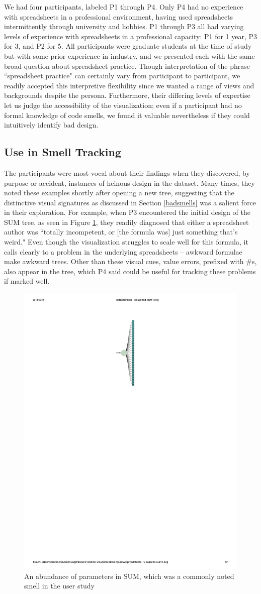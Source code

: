 \documentclass[conference]{IEEEtran}
\begin{document}
	We had four participants, labeled P1 through P4. Only P4 had no experience with
	spreadsheets in a professional environment, having used spreadsheets
	intermittently through university and hobbies. P1 through P3 all had varying
	levels of experience with spreadsheets in a professional capacity: P1 for 1
	year, P3 for 3, and P2 for 5. All participants were graduate students at the
	time of study but with some prior experience in industry, and we presented each
	with the same broad question about spreadsheet practice. Though interpretation
	of the phrase ``spreadsheet practice" can certainly vary from participant to
	participant, we readily accepted this interpretive flexibility since we wanted
	a range of views and backgrounds despite the persona. Furthermore, their
	differing levels of expertise let us judge the accessibility of the
	visualization; even if a participant had no formal knowledge of code smells, we
	found it valuable nevertheless if they could intuitively identify bad design.
	
	\subsection{Use in Smell Tracking}
	
	The participants were most vocal about their findings when they discovered, by
	purpose or accident, instances of heinous design in the dataset. Many times,
	they noted these examples shortly after opening a new tree, suggesting that the
	distinctive visual signatures as discussed in Section \ref{badsmells} was a
	salient force in their exploration. For example, when P3 encountered the
	initial design of the SUM tree, as seen in Figure \ref{fig:sum}, they readily
	diagnosed that either a spreadsheet author was ``totally incompetent, or [the
	formula was] just something that's weird." Even though the visualization
	struggles to scale well for this formula, it calls clearly to a problem in the
	underlying spreadsheets -- awkward formulae make awkward trees. Other than
	these visual cues, value errors, prefixed with \#s, also appear in the tree,
	which P4 said could be useful for tracking these problems if marked well.
	
	\begin{figure} \centering
		\includegraphics[width=.20\textwidth]{SUM}  \caption{An abundance of parameters
			in SUM, which was a commonly noted smell in the user study} \label{fig:sum}
	\end{figure}
	
\end{document}
